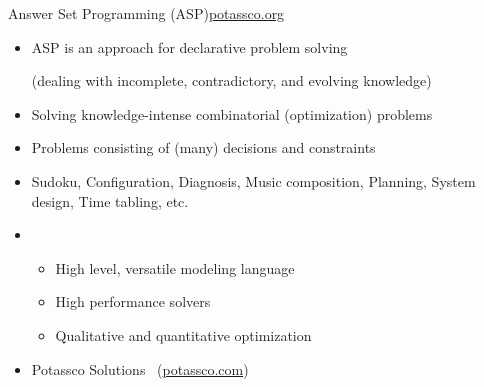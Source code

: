 \begin{frame}{Answer Set Programming (ASP)}{\url{potassco.org}}
  \begin{itemize}
  \item {}

    ASP is an approach for declarative problem solving

    (dealing with incomplete, contradictory, and evolving knowledge)
  \item {}

    Solving knowledge-intense combinatorial (optimization) problems
  \item {}

    {Problems consisting of (many) decisions and constraints}
  \item[] 
    Sudoku,
    Configuration,
    Diagnosis,
    Music composition,
    Planning,
    System design,
    Time tabling,
    etc.
  \item{}
    \begin{itemize}
    \item High level, versatile modeling language
    \item High performance solvers
    \item Qualitative and quantitative optimization
    \end{itemize}
  \item {}\quad
    {Potassco Solutions} \ (\url{potassco.com})
  \end{itemize}
\end{frame}
%
